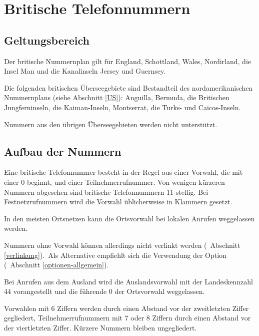 \documentclass[numbers=noenddot]{scrreprt}
\newcommand\Abschnittsliteratur[1]{\bgroup
\small
\raggedright
\printbibliography[heading=subbibnumbered,keyword=#1]
\egroup}
\newcommand\UeberschriftGeltungsbereich{\section{Geltungsbereich}}
\newcommand\UeberschriftAufbau{\section{Aufbau der Nummern}}
\newcommand\KeineVerlinkung{Nummern ohne Vorwahl können allerdings nicht verlinkt werden
\vglAbschnitt{verlinkung}.}
\newcommand*\vglAbschnitt[1]{(\cf\ Abschnitt \ref{#1})}
\newcommand*\sieheAbschnitt[1]{(siehe Abschnitt \ref{#1})}
\newcommand*\AufbauDEATD[1]{Bei Anrufen aus dem Ausland wird die Auslandsvorwahl mit der Landeskennzahl #1 vorangestellt und die führende 0 der Ortsvorwahl weggelassen.}
\begin{document}
\Abschnittsliteratur{french}

\chapter{Britische Telefonnummern}
\nocite{wikipedia-UK}
\nocite{wikipedia-UK-history}
\nocite{wikipedia-conventions}
\edef\myindent{\the\parindent}
\begin{minipage}{12cm}\setlength{\parindent}{\myindent}
\UeberschriftGeltungsbereich
Der britische Nummernplan
\cite{Ofcom-plan}
gilt für England, Schottland, Wales, Nordirland, die Insel Man und die Kanalinseln Jersey und Guernsey.

Die folgenden britischen Überseegebiete sind Bestandteil des nordamerikanischen Nummernplans
\sieheAbschnitt{US}: Anguilla, Bermuda, die Britischen Jungferninseln, die Kaiman-Inseln, Montserrat, die Turks- und Caicos-Inseln.

Nummern aus den übrigen Überseegebieten werden nicht unterstützt.
\end{minipage}
\hfill
{}

\UeberschriftAufbau
Eine britische Telefonnummer besteht in der Regel aus einer Vorwahl, die mit einer 0 beginnt, und einer Teilnehmerrufnummer. Von wenigen kürzeren Nummern abgesehen sind britische Telefonnummern 11-stellig. Bei Festnetzrufnummern wird die Vorwahl üblicherweise in Klammern gesetzt.
\begin{sidebyside}
\end{sidebyside}

In den meisten Ortsnetzen kann die Ortsvorwahl bei lokalen Anrufen weggelassen werden.
\begin{sidebyside}
\end{sidebyside}
\KeineVerlinkung\ Als Alternative empfiehlt sich die Verwendung der Option 
\vglAbschnitt{optionen-allgemein}.

\AufbauDEATD{44}
\begin{sidebyside}
\end{sidebyside}

Vorwahlen mit 6 Ziffern werden durch einen Abstand vor der zweitletzten Ziffer gegliedert, Teilnehmerrufnummern mit 7 oder 8 Ziffern durch einen Abstand vor der viertletzten Ziffer. Kürzere Nummern bleiben ungegliedert.
\begin{sidebyside}
   \\
   \\
\end{sidebyside}
\end{document}
